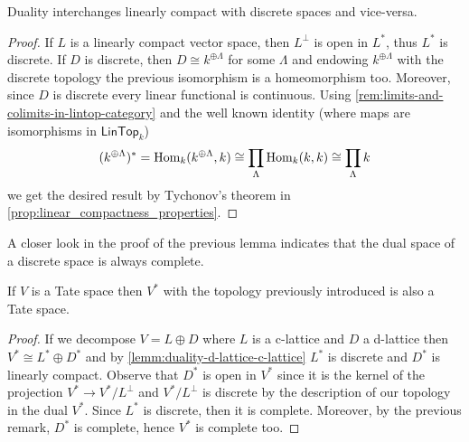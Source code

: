 \begin{lemma}\label{lemm:duality-d-lattice-c-lattice}
	Duality interchanges linearly compact with discrete spaces and vice-versa. 
\end{lemma}
\begin{proof}
	If $L$ is a linearly compact vector space, then $L^{\perp}$ is open in $L^{*}$, thus $L^{*}$ is discrete. If $D$ is discrete, then $D \cong k^{\oplus \Lambda}$ for some $\Lambda$ and endowing $k^{\oplus \Lambda}$ with the discrete topology the previous isomorphism is a homeomorphism too. Moreover, since $D$ is discrete every linear functional is continuous. Using \cref{rem:limits-and-colimits-in-lintop-category} and the well known identity (where maps are isomorphisms in $\mathsf{LinTop}_{k}$)
	\[
		(k^{\oplus \Lambda})^{*} = \operatorname{Hom}_{k}(k^{\oplus \Lambda}, k) \cong \prod_{\Lambda} \operatorname{Hom}_{k}(k, k) \cong \prod_{\Lambda} k
	\]
	we get the desired result by Tychonov's theorem in \cref{prop:linear_compactness_properties}. 
\end{proof}
\begin{remark}\label{rem:dual-of-discrete-is-complete}
	A closer look in the proof of the previous lemma indicates that the dual space of a discrete space is always complete.
\end{remark}
\begin{proposition}\label{prop:dual-space-is-tate}
	If $V$ is a Tate space then $V^{*}$ with the topology previously introduced is also a Tate space.
\end{proposition}
\begin{proof}
	If we decompose $V = L \oplus D$ where $L$ is a c-lattice and $D$ a d-lattice then $V^{*} \cong L^{*} \oplus D^{*}$ and by \cref{lemm:duality-d-lattice-c-lattice} $L^{*}$ is discrete and $D^{*}$ is linearly compact. Observe that $D^{*}$ is open in $V^{*}$ since it is the kernel of the projection $V^{*} \to V^{*}/L^{\perp}$ and $V^{*}/L^{\perp}$ is discrete by the description of our topology in the dual $V^{*}$. Since $L^{*}$ is discrete, then it is complete. Moreover, by the previous remark, $D^{*}$ is complete, hence $V^{*}$ is complete too.
\end{proof}

